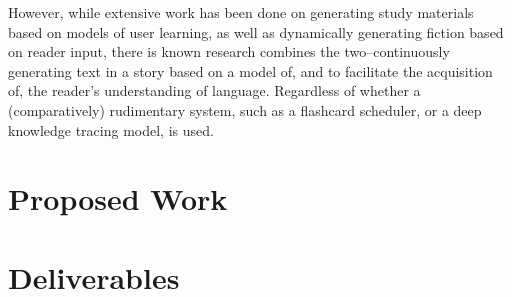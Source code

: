 \documentclass[
	letterpaper, %
]{jdf}
\begin{document}
However, while extensive work has been done on generating study materials based on models of user learning, as well as dynamically generating fiction based on reader input, there is known research combines the two–continuously generating text in a story based on a model of, and to facilitate the acquisition of, the reader's understanding of language. Regardless of whether a (comparatively) rudimentary system, such as a flashcard scheduler, or a deep knowledge tracing model, is used.


\section{Proposed Work}




\section{Deliverables}
\end{document}
